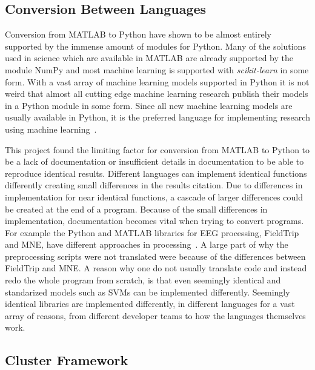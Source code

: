 \documentclass[12pt, a4paper]{article}
\begin{document}
\subsection{Conversion Between Languages}

Conversion from MATLAB to Python have shown to be almost entirely supported by the immense amount of modules for Python.
Many of the solutions used in science which are available in MATLAB are already supported by the module NumPy and most machine learning is supported with \textsl{scikit-learn} in some form.
With a vast array of machine learning models supported in Python it is not weird that almost all cutting edge machine learning research publish their models in a Python module in some form.
Since all new machine learning models are usually available in Python, it is the preferred language for implementing research using machine learning~\cite{Silaparasetty2020}.

This project found the limiting factor for conversion from MATLAB to Python to be a lack of documentation or insufficient details in documentation to be able to reproduce identical results.
Different languages can implement identical functions differently creating small differences in the results citation.
Due to differences in implementation for near identical functions, a cascade of larger differences could be created at the end of a program.
Because of the small differences in implementation, documentation becomes vital when trying to convert programs.
For example the Python and MATLAB libraries for EEG processing, FieldTrip and MNE, have different approaches in processing~\cite{MNEVersusFielder}.
A large part of why the preprocessing scripts were not translated were because of the differences between FieldTrip and MNE. 
A reason why one do not usually translate code and instead redo the whole program from scratch, is that even seemingly identical and standarized models such as SVMs can be implemented differently.
Seemingly identical libraries are implemented differently, in different languages for a vast array of reasons, from different developer teams to how the languages themselves work.

\subsection{Cluster Framework}
\end{document}

